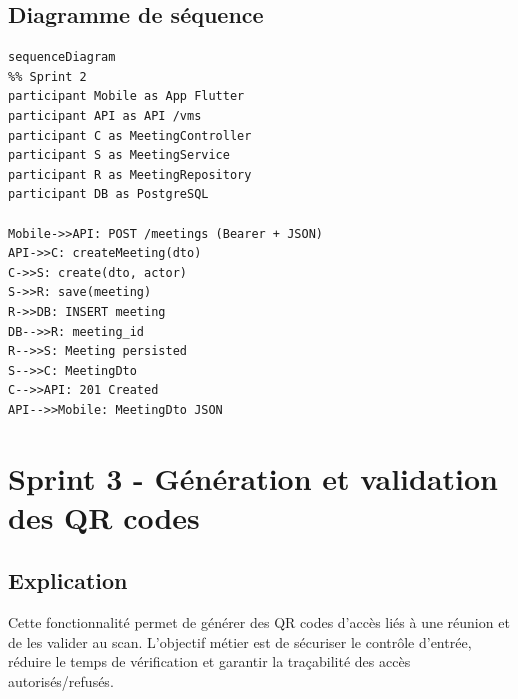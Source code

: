 \documentclass[12pt,a4paper]{article}
\begin{document}
\subsection*{Diagramme de séquence}
\begin{verbatim}
sequenceDiagram
%% Sprint 2
participant Mobile as App Flutter
participant API as API /vms
participant C as MeetingController
participant S as MeetingService
participant R as MeetingRepository
participant DB as PostgreSQL

Mobile->>API: POST /meetings (Bearer + JSON)
API->>C: createMeeting(dto)
C->>S: create(dto, actor)
S->>R: save(meeting)
R->>DB: INSERT meeting
DB-->>R: meeting_id
R-->>S: Meeting persisted
S-->>C: MeetingDto
C-->>API: 201 Created
API-->>Mobile: MeetingDto JSON
\end{verbatim}

\section*{Sprint 3 - Génération et validation des QR codes}
\subsection*{Explication}
Cette fonctionnalité permet de générer des QR codes d’accès liés à une réunion et de les valider au scan. L’objectif métier est de sécuriser le contrôle d’entrée, réduire le temps de vérification et garantir la traçabilité des accès autorisés/refusés.
\end{document}
